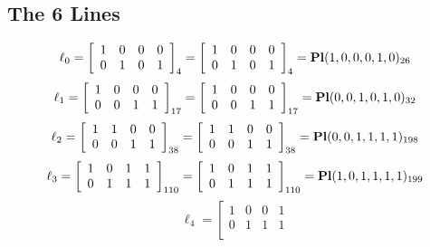 \documentclass{article}
\begin{document}
{\subsection*{The 6 Lines}
$$
\ell_{0} = 
\left[
\begin{array}{*{4}{r}}
1 & 0 & 0 & 0\\
0 & 1 & 0 & 1\\
\end{array}
\right]
_{4}
=
\left[
\begin{array}{*{4}c}
1  & 0  & 0  & 0\\
0  & 1  & 0  & 1\\
\end{array}
\right]_{4}
={\rm\bf Pl}(1,0,0,0,1,0 )_{26}$$
$$
\ell_{1} = 
\left[
\begin{array}{*{4}{r}}
1 & 0 & 0 & 0\\
0 & 0 & 1 & 1\\
\end{array}
\right]
_{17}
=
\left[
\begin{array}{*{4}c}
1  & 0  & 0  & 0\\
0  & 0  & 1  & 1\\
\end{array}
\right]_{17}
={\rm\bf Pl}(0,0,1,0,1,0 )_{32}$$
$$
\ell_{2} = 
\left[
\begin{array}{*{4}{r}}
1 & 1 & 0 & 0\\
0 & 0 & 1 & 1\\
\end{array}
\right]
_{38}
=
\left[
\begin{array}{*{4}c}
1  & 1  & 0  & 0\\
0  & 0  & 1  & 1\\
\end{array}
\right]_{38}
={\rm\bf Pl}(0,0,1,1,1,1 )_{198}$$
$$
\ell_{3} = 
\left[
\begin{array}{*{4}{r}}
1 & 0 & 1 & 1\\
0 & 1 & 1 & 1\\
\end{array}
\right]
_{110}
=
\left[
\begin{array}{*{4}c}
1  & 0  & 1  & 1\\
0  & 1  & 1  & 1\\
\end{array}
\right]_{110}
={\rm\bf Pl}(1,0,1,1,1,1 )_{199}$$
$$
\ell_{4} = 
\left[
\begin{array}{*{4}{r}}
1 & 0 & 0 & 1\\
0 & 1 & 1 & 1\\
\end{array}
$$}
\end{document}
